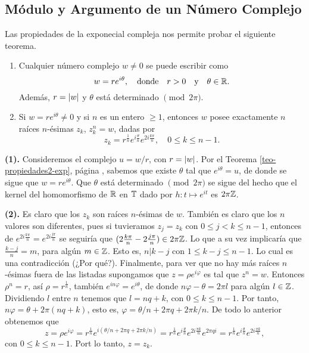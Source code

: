 \subsection{Módulo y Argumento de un Número Complejo}
Las propiedades de la exponecial compleja nos permite probar el siguiente teorema.
\begin{theo}
    \begin{enumerate}
        \item Cualquier número complejo \(w\neq 0\) se puede escribir como 
        \[
            w=re^{i\theta}, \quad \text{donde}\quad r>0 \quad \text{y}\quad \theta\in \mathbb{R}.
        \]
        Además, \(r=\left\lvert w\right\rvert\) y \(\theta\) está determinado \(\pmod{2\pi}\).
        \item Si  \(w=re^{i\theta} \neq 0\) y si \(n\) es un entero \(\geq 1\), entonces \(w\) posee exactamente \(n\) raíces \(n\)-ésimas \(z_k\), \(z_k^n = w\),
        dadas por 
        \[
            z_k = r^{\frac{1}{n}}e^{i\frac{\theta}{n}}e^{2i\frac{k\pi}{n}}, \quad 0\leq k\leq n-1.
        \]
    \end{enumerate}
\end{theo}
\begin{dem}
    {\bf (1).} Consideremos el complejo \(u = w/r\), con \(r = \left\lvert w\right\rvert\). Por el Teorema \ref{teo-propiedades2-exp}, 
    página \pageref{teo-propiedades2-exp}, sabemos que existe \(\theta\) tal que \(e^{i\theta} = u\), de donde se sigue
    que \(w = re^{i\theta}\). Que \(\theta\) está determinado \(\pmod{2\pi}\) se sigue del hecho que el kernel del homomorfismo
    de \(\mathbb{R}\) en \(\mathbb{T}\) dado por \(h: t \mapsto e^{it}\) es \(2\pi\mathbb{Z}\).

    {\bf (2).} Es claro que los \(z_k\) son raíces \(n\)-ésimas de \(w\). También es claro que los \(n\) valores son diferentes, pues si tuvieramos
    \(z_j = z_k\) con \(0\leq j < k \leq n-1\), entonces de \(e^{2i\frac{k\pi}{n}} = e^{2i\frac{j\pi}{n}}\) se seguiría que \((2\frac{k\pi}{n} - 2\frac{j\pi}{n}) \in 2\pi\mathbb{Z} \).
    Lo que a su vez implicaría que \(\frac{k-j}{n} = m\), para algún \(m \in \mathbb{Z}\). Esto es, \(n | k-j\) con \(1\leq k-j \leq n-1\). Lo cual es una
    contradicción (¿Por qué?). Finalmente, para ver que no hay más raíces \(n\)-ésimas fuera de las listadas supongamos que \(z= \rho e^{i\varphi}\)
    es tal que \(z^n = w\). Entonces \(\rho^n = r\), así \( \rho = r^{\frac{1}{n}}\), también \(e^{in\varphi} = e^{i\theta}\), de donde 
    \(n\varphi - \theta = 2\pi l \) para algún \(l\in \mathbb{Z}\). Dividiendo \(l\) entre \(n\) tenemos que \(l = nq + k\), con \(0\leq k \leq n-1 \). 
    Por tanto, \(n\varphi = \theta + 2\pi (nq + k) \), esto es, \(\varphi = \theta/n + 2\pi q + 2\pi k / n\). De todo lo anterior obtenemos que 
    \[
    z = \rho e^{i\varphi} = r^{\frac{1}{n}}e^{i(\theta/n + 2\pi q + 2\pi k / n)} = 
    r^{\frac{1}{n}}e^{i\frac{\theta}{n}}e^{2i\frac{\pi k}{n}}e^{2\pi qi} = r^{\frac{1}{n}}e^{i\frac{\theta}{n}}e^{2i\frac{\pi k}{n}},
    \] 
    con \(0\leq k \leq n-1\). Port lo tanto, \(z = z_k\).
\end{dem}

